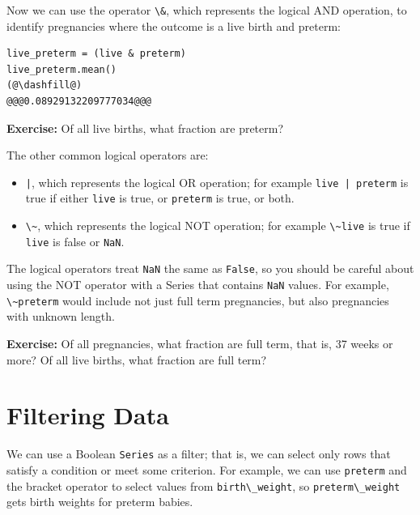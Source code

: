 Now we can use the operator \passthrough{\lstinline!\&!}, which
represents the logical AND operation, to identify pregnancies where the
outcome is a live birth and preterm:

\begin{lstlisting}[]
live_preterm = (live & preterm)
live_preterm.mean()
(@\dashfill@)
@@@0.08929132209777034@@@
\end{lstlisting}

\textbf{Exercise:} Of all live births, what fraction are preterm?

The other common logical operators are:

\begin{itemize}
\item
  \passthrough{\lstinline!|!}, which represents the logical OR
  operation; for example \passthrough{\lstinline!live | preterm!} is
  true if either \passthrough{\lstinline!live!} is true, or
  \passthrough{\lstinline!preterm!} is true, or both.
\item
  \passthrough{\lstinline!\~!}, which represents the logical NOT
  operation; for example \passthrough{\lstinline!\~live!} is true if
  \passthrough{\lstinline!live!} is false or
  \passthrough{\lstinline!NaN!}.
\end{itemize}

The logical operators treat \passthrough{\lstinline!NaN!} the same as
\passthrough{\lstinline!False!}, so you should be careful about using
the NOT operator with a Series that contains
\passthrough{\lstinline!NaN!} values. For example,
\passthrough{\lstinline!\~preterm!} would include not just full term
pregnancies, but also pregnancies with unknown length.

\textbf{Exercise:} Of all pregnancies, what fraction are full term, that
is, 37 weeks or more? Of all live births, what fraction are full term?

\hypertarget{filtering-data}{%
\section{Filtering Data}\label{filtering-data}}

We can use a Boolean \passthrough{\lstinline!Series!} as a filter; that
is, we can select only rows that satisfy a condition or meet some
criterion. For example, we can use \passthrough{\lstinline!preterm!} and
the bracket operator to select values from
\passthrough{\lstinline!birth\_weight!}, so
\passthrough{\lstinline!preterm\_weight!} gets birth weights for preterm
babies.

